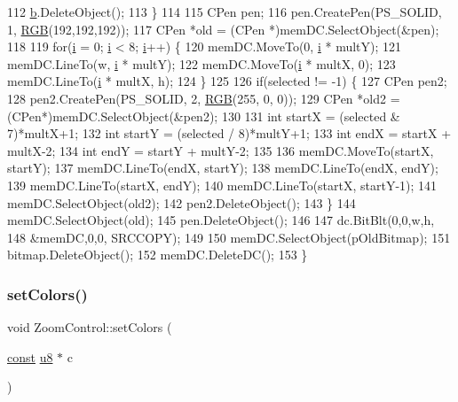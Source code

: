 \begin{DoxyCode}
112     \mbox{\hyperlink{expr-lex_8cpp_a91b64995742fd30063314f12340b4b5a}{b}}.DeleteObject();
113   \}
114 
115   CPen pen;
116   pen.CreatePen(PS\_SOLID, 1, \mbox{\hyperlink{bilinear_8cpp_a4a118ad3ee36468a3fa616977a64864e}{RGB}}(192,192,192));
117   CPen *old = (CPen *)memDC.SelectObject(&pen);
118 
119   \textcolor{keywordflow}{for}(\mbox{\hyperlink{expr-lex_8cpp_acb559820d9ca11295b4500f179ef6392}{i}} = 0; \mbox{\hyperlink{expr-lex_8cpp_acb559820d9ca11295b4500f179ef6392}{i}} < 8; \mbox{\hyperlink{expr-lex_8cpp_acb559820d9ca11295b4500f179ef6392}{i}}++) \{
120     memDC.MoveTo(0, \mbox{\hyperlink{expr-lex_8cpp_acb559820d9ca11295b4500f179ef6392}{i}} * multY);
121     memDC.LineTo(w, \mbox{\hyperlink{expr-lex_8cpp_acb559820d9ca11295b4500f179ef6392}{i}} * multY);
122     memDC.MoveTo(\mbox{\hyperlink{expr-lex_8cpp_acb559820d9ca11295b4500f179ef6392}{i}} * multX, 0);
123     memDC.LineTo(\mbox{\hyperlink{expr-lex_8cpp_acb559820d9ca11295b4500f179ef6392}{i}} * multX, h);
124   \}
125 
126   \textcolor{keywordflow}{if}(selected != -1) \{
127     CPen pen2;
128     pen2.CreatePen(PS\_SOLID, 2, \mbox{\hyperlink{bilinear_8cpp_a4a118ad3ee36468a3fa616977a64864e}{RGB}}(255, 0, 0));
129     CPen *old2 = (CPen*)memDC.SelectObject(&pen2);
130 
131     \textcolor{keywordtype}{int} startX = (selected & 7)*multX+1;
132     \textcolor{keywordtype}{int} startY = (selected / 8)*multY+1;
133     \textcolor{keywordtype}{int} endX = startX + multX-2;
134     \textcolor{keywordtype}{int} endY = startY + multY-2;
135     
136     memDC.MoveTo(startX, startY);
137     memDC.LineTo(endX, startY);
138     memDC.LineTo(endX, endY);
139     memDC.LineTo(startX, endY);
140     memDC.LineTo(startX, startY-1);
141     memDC.SelectObject(old2);
142     pen2.DeleteObject();
143   \}
144   memDC.SelectObject(old);
145   pen.DeleteObject();
146 
147   dc.BitBlt(0,0,w,h,
148             &memDC,0,0, SRCCOPY);
149 
150   memDC.SelectObject(pOldBitmap);
151   bitmap.DeleteObject();
152   memDC.DeleteDC();
153 \}
\end{DoxyCode}
\mbox{\label{class_zoom_control_a97501cc16d3068eefa1b5d9d23e9d0d9}} 
\subsubsection{\texorpdfstring{set\+Colors()}{setColors()}}
{\footnotesize\ttfamily void Zoom\+Control\+::set\+Colors (\begin{DoxyParamCaption}\item[{\mbox{\hyperlink{getopt1_8c_a2c212835823e3c54a8ab6d95c652660e}{const}} \mbox{\hyperlink{_system_8h_aed742c436da53c1080638ce6ef7d13de}{u8}} $\ast$}]{c }\end{DoxyParamCaption})}



